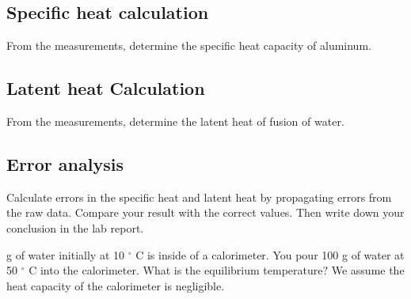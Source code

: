 \subsection*{Specific heat calculation}
From the measurements, determine the specific heat capacity of aluminum.
\subsection*{Latent heat Calculation}
From the measurements, determine the latent heat of fusion of water. 
\subsection*{Error analysis}
Calculate errors in the specific heat and latent heat by propagating errors from the raw data. Compare your result with the correct values. Then write down your conclusion in the lab report. 


\prelab

 g of water initially at 10 $^\circ$ C is inside of a calorimeter. You pour 100 g of water at 50 $^\circ$ C into the calorimeter. What is the equilibrium temperature? We assume the heat capacity of the calorimeter is negligible. 

